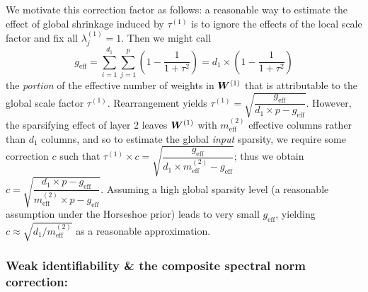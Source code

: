 We motivate this correction factor as follows: a reasonable way to estimate the effect of global shrinkage induced by $\tau^{(1)}$ is to ignore the effects of the local scale factor and fix all $\lambda_j^{(1)}= 1$.  Then we might call 
\begin{equation}
    g_\text{eff} = \sum_{i=1}^{d_1} \sum_{j=1}^p \left(1 - \frac{1}{1 + \tau^2}\right) = d_1 \times \left(1 - \frac{1}{1 + \tau^2}\right)
\end{equation}
the \textit{portion} of the effective number of weights in $\bm{W}^{(1)}$ that is attributable to the global scale factor $\tau^{(1)}$.  Rearrangement yields $\tau^{(1)} = \sqrt{\dfrac{g_\text{eff}}{d_1 \times p - g_\text{eff}}}$.  However, the sparsifying effect of layer 2 leaves $\bm{W}^{(1)}$ with $m^{(2)}_\text{eff}$ effective columns rather than $d_1$ columns, and so to estimate the global \textit{input} sparsity, we require some correction $c$ such that $\tau^{(1)} \times c = \sqrt{\dfrac{g_\text{eff}}{d_1 \times m_\text{eff}^{(2)} - g_\text{eff}}}$; thus we obtain $c = \sqrt{ \dfrac{d_1\times p - g_\text{eff}}{m^{(2)}_\text{eff} \times p - g_\text{eff}}}$.  Assuming a high global sparsity level (a reasonable assumption under the Horseshoe prior) leads to very small $g_\text{eff}$, yielding $c \approx \sqrt{d_1 / m^{(2)}_\text{eff}}$ as a reasonable approximation.



\subsubsection*{Weak identifiability \& the composite spectral norm correction:} 
\label{par:ch3-spectral}


